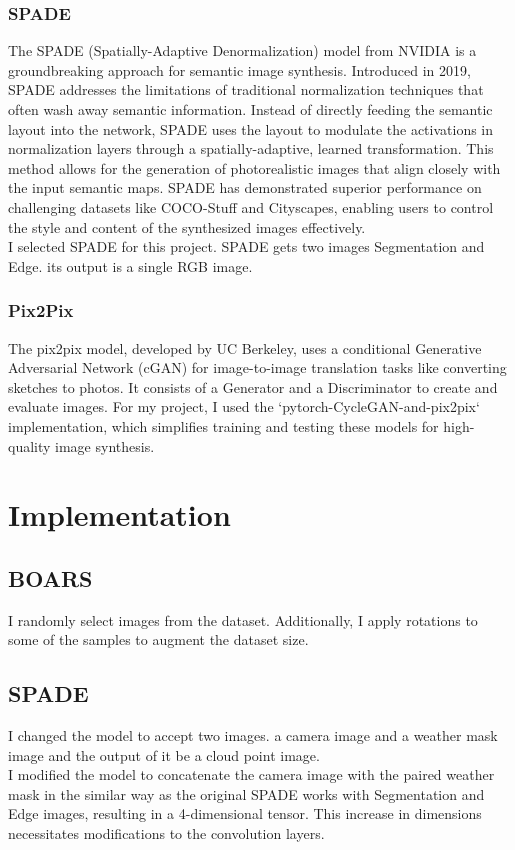\subsubsection{SPADE}
The SPADE (Spatially-Adaptive Denormalization) model from NVIDIA is a groundbreaking approach for semantic image synthesis. Introduced in 2019, SPADE addresses the limitations of traditional normalization techniques that often wash away semantic information. Instead of directly feeding the semantic layout into the network, SPADE uses the layout to modulate the activations in normalization layers through a spatially-adaptive, learned transformation. This method allows for the generation of photorealistic images that align closely with the input semantic maps. SPADE has demonstrated superior performance on challenging datasets like COCO-Stuff and Cityscapes, enabling users to control the style and content of the synthesized images effectively.
\\ I selected SPADE for this project. SPADE gets two images Segmentation and Edge. its output is a single RGB image.
\subsubsection{Pix2Pix}
The pix2pix model, developed by UC Berkeley, uses a conditional Generative Adversarial Network (cGAN) for image-to-image translation tasks like converting sketches to photos. It consists of a Generator and a Discriminator to create and evaluate images. For my project, I used the `pytorch-CycleGAN-and-pix2pix` implementation, which simplifies training and testing these models for high-quality image synthesis.
\section{Implementation}
\subsection{BOARS}
I randomly select images from the dataset. Additionally, I apply rotations to some of the samples to augment the dataset size.
\subsection{SPADE}
I changed the model to accept two images. a camera image and a weather mask image and the output of it be a cloud point image.
\\
I modified the model to concatenate the camera image with the paired weather mask in the similar way as the original SPADE works with Segmentation and Edge images, resulting in a 4-dimensional tensor.
This increase in dimensions necessitates modifications to the convolution layers.
